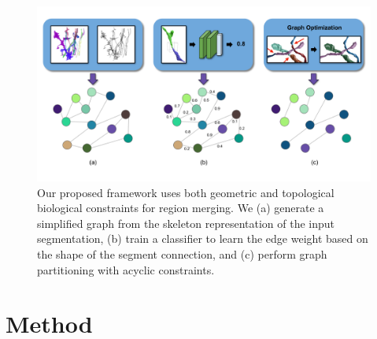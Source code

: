 \begin{figure}[t!]
	\centering
	\includegraphics[width=\linewidth]{./figures/teaser_v4.png}
	\caption{Our proposed framework uses both geometric and topological biological constraints for region merging. We (a) generate a simplified graph from the skeleton representation of the input segmentation, (b) train a classifier to learn the edge weight based on the shape of the segment connection, and (c) perform graph partitioning with acyclic constraints.}
	\label{fig:teaser_pipeline}
\end{figure}
\section{Method}


